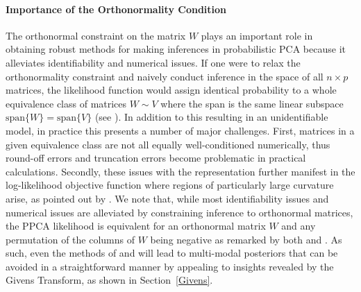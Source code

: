 \documentclass{article}
\begin{document}
\paragraph{Importance of the Orthonormality Condition}
The orthonormal constraint on the matrix $W$ plays an important role in obtaining robust methods for making inferences in probabilistic PCA because it alleviates identifiability and numerical issues.  If one were to relax the orthonormality constraint and naively conduct inference in the space of all $n\times p$ matrices, the likelihood function would assign identical probability to a whole equivalence class of matrices $W \sim V$ where the span is the same linear subspace $\mbox{span}\{W\} = \mbox{span}\{V\}$ (see \citet[chapt.~12.1.3]{murphy2012machine}).  In addition to this resulting in an unidentifiable model, in practice this presents a number of major challenges.  First, matrices in a given equivalence class are not all equally well-conditioned numerically, thus round-off errors and truncation errors become problematic in practical calculations.  Secondly, these issues with the representation further manifest in the log-likelihood objective function where regions of particularly large curvature arise, as pointed out by \citep{holbrook2016bayesian}. We note that, while most identifiability issues and numerical issues are alleviated by constraining inference to orthonormal matrices, the PPCA likelihood is equivalent for an orthonormal matrix $W$ and any permutation of the columns of $W$ being negative as remarked by both \citet[chapt.~12.1.3]{murphy2012machine} and  \citet{holbrook2016bayesian}. As such, even the methods of \citet{brubaker2012family} and \citet{byrne2013geodesic} will lead to multi-modal posteriors that can be avoided in a straightforward manner by appealing to insights revealed by the Givens Transform, as shown in Section~\ref{Givens}.

\end{document}

